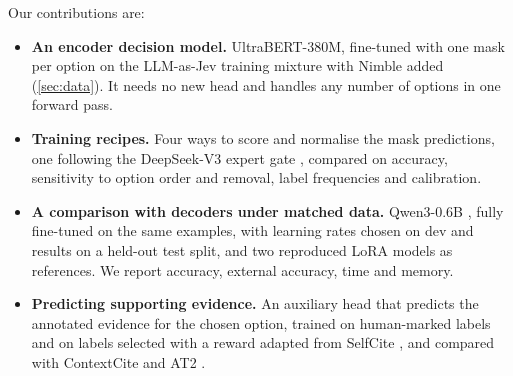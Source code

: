 Our contributions are:
\begin{itemize}\setlength{\itemsep}{2pt}\setlength{\topsep}{2pt}
  \item \textbf{An encoder decision model.}
    UltraBERT-380M, fine-tuned with one mask per option on the LLM-as-Jev training mixture with Nimble added (\cref{sec:data}).
    It needs no new head and handles any number of options in one forward pass.
  \item \textbf{Training recipes.}
    Four ways to score and normalise the mask predictions, one following the DeepSeek-V3 expert gate \citep{deepseekv3}, compared on accuracy, sensitivity to option order and removal, label frequencies and calibration.
  \item \textbf{A comparison with decoders under matched data.}
    Qwen3-0.6B \citep{qwen3}, fully fine-tuned on the same examples, with learning rates chosen on dev and results on a held-out test split, and two reproduced LoRA models \citep{lora} as references.
    We report accuracy, external accuracy, time and memory.
  \item \textbf{Predicting supporting evidence.}
    An auxiliary head that predicts the annotated evidence for the chosen option, trained on human-marked labels and on labels selected with a reward adapted from SelfCite \citep{selfcite}, and compared with ContextCite \citep{contextcite} and AT2 \citep{at2}.
\end{itemize}
